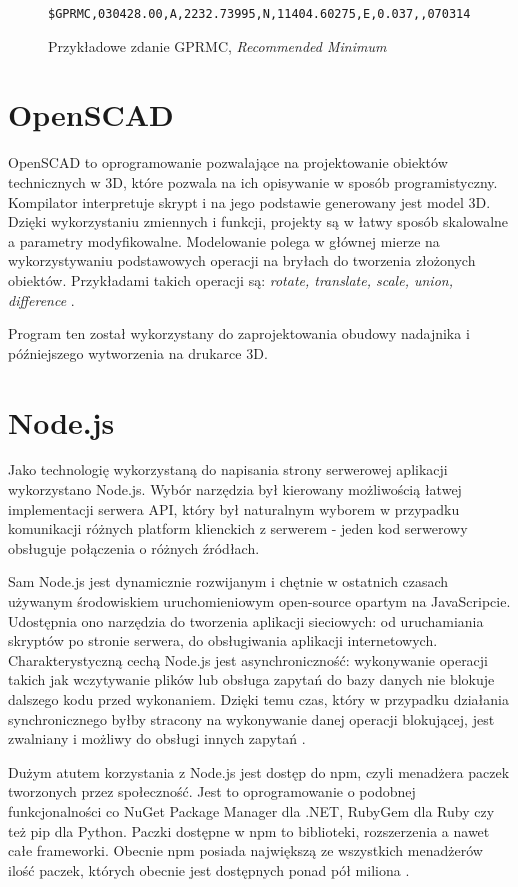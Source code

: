 \documentclass[eng,printmode]{mgr}
\begin{document}
\begin{figure}
\begin{lstlisting}[breaklines]
  $GPRMC,030428.00,A,2232.73995,N,11404.60275,E,0.037,,070314,,,A*7E
\end{lstlisting}
\caption{Przykładowe zdanie GPRMC, \textit{Recommended Minimum}}
\end{figure}

\section{OpenSCAD}
OpenSCAD to oprogramowanie pozwalające na projektowanie obiektów technicznych w 3D, które pozwala na ich opisywanie w sposób programistyczny. Kompilator interpretuje skrypt i na jego podstawie generowany jest model 3D. Dzięki wykorzystaniu zmiennych i funkcji, projekty są w łatwy sposób skalowalne a parametry modyfikowalne. Modelowanie polega w głównej mierze na wykorzystywaniu podstawowych operacji na bryłach do tworzenia złożonych obiektów. Przykładami takich operacji są: \textit{rotate, translate, scale, union, difference} \cite{openscad}.

Program ten został wykorzystany do zaprojektowania obudowy nadajnika i późniejszego wytworzenia na drukarce 3D.


\section{Node.js}
Jako technologię wykorzystaną do napisania strony serwerowej aplikacji wykorzystano Node.js. Wybór narzędzia był kierowany możliwością łatwej implementacji serwera API, który był naturalnym wyborem w przypadku komunikacji różnych platform klienckich z serwerem - jeden kod serwerowy obsługuje połączenia o różnych źródłach.

Sam Node.js jest dynamicznie rozwijanym i chętnie w ostatnich czasach używanym środowiskiem uruchomieniowym open-source opartym na JavaScripcie. Udostępnia ono narzędzia do tworzenia aplikacji sieciowych: od uruchamiania skryptów po stronie serwera, do obsługiwania aplikacji internetowych. Charakterystyczną cechą Node.js jest asynchroniczność: wykonywanie operacji takich jak wczytywanie plików lub obsługa zapytań do bazy danych nie blokuje dalszego kodu przed wykonaniem. Dzięki temu czas, który w przypadku działania synchronicznego byłby stracony na wykonywanie danej operacji blokującej, jest zwalniany i możliwy do obsługi innych zapytań \cite{nodejs_blocking}.

Dużym atutem korzystania z Node.js jest dostęp do npm, czyli menadżera paczek tworzonych przez społeczność. Jest to oprogramowanie o podobnej funkcjonalności co NuGet Package Manager dla .NET, RubyGem dla Ruby czy też pip dla Python. Paczki dostępne w npm to biblioteki, rozszerzenia a nawet całe frameworki. Obecnie npm posiada największą ze wszystkich menadżerów ilość paczek, których obecnie jest dostępnych ponad pół miliona \cite{module_counts}.
\end{document}
